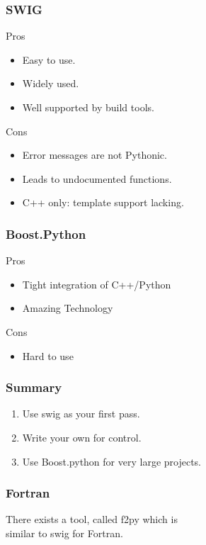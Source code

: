 \begin{frame}[fragile]
\frametitle{SWIG}
\begin{block}{Pros}
\begin{itemize}
\item Easy to use.
\item Widely used.
\item Well supported by build tools.
\end{itemize}
\end{block}

\begin{block}{Cons}
\begin{itemize}
\item Error messages are not Pythonic.
\item Leads to undocumented functions.
\item \alert{C++ only:} template support lacking.
\end{itemize}
\end{block}
\end{frame}

\begin{frame}[fragile]
\frametitle{Boost.Python}
\begin{block}{Pros}
\begin{itemize}
\item Tight integration of C++/Python
\item Amazing Technology
\end{itemize}
\end{block}

\begin{block}{Cons}
\begin{itemize}
\item Hard to use
\end{itemize}
\end{block}
\end{frame}

\begin{frame}[fragile]
\frametitle{Summary}
\begin{enumerate}
\item Use \alert{swig} as your first pass.
\item Write your own for control.
\item Use Boost.python for very large projects.
\end{enumerate}
\end{frame}

\begin{frame}[fragile]
\frametitle{Fortran}
There exists a tool, called \alert{f2py} which is\\
similar to swig for Fortran.
\end{frame}





